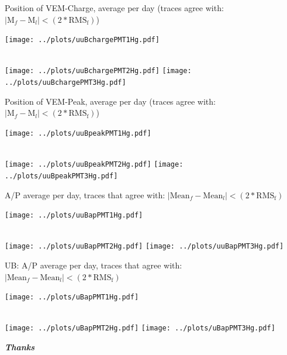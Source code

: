 \documentclass[aspectratio=169]{beamer}
\begin{document}
\begin{frame}
	Position of VEM-Charge, average per day (traces agree with: $\mid \mathrm{M}_f - \mathrm{M}_l \mid < \left( 2*\mathrm{RMS_f} \right) $)

  \centering
	\texttt{[image: ../plots/uuBchargePMT1Hg.pdf]}\quad%
	\begin{minipage}[b][0.4\textheight][c]
		{.45\linewidth}
	\end{minipage}\\[1em]
	\texttt{[image: ../plots/uuBchargePMT2Hg.pdf]}\quad%
	\texttt{[image: ../plots/uuBchargePMT3Hg.pdf]}
\end{frame}


\begin{frame}
	Position of VEM-Peak, average per day (traces agree with: $\mid \mathrm{M}_f - \mathrm{M}_l \mid < \left( 2*\mathrm{RMS_f} \right) $)

  \centering
	\texttt{[image: ../plots/uuBpeakPMT1Hg.pdf]}\quad%
	\begin{minipage}[b][0.4\textheight][c]
		{.45\linewidth}
	\end{minipage}\\[1em]
	\texttt{[image: ../plots/uuBpeakPMT2Hg.pdf]}\quad%
	\texttt{[image: ../plots/uuBpeakPMT3Hg.pdf]}
\end{frame}


\begin{frame}
	A/P average per day, traces that agree with: $\mid \mathrm{Mean}_f - \mathrm{Mean}_l \mid < \left( 2*\mathrm{RMS_f} \right) $

  \centering
	\texttt{[image: ../plots/uuBapPMT1Hg.pdf]}%
	\begin{minipage}[b][0.2\textheight][c]
		{.15\linewidth}
	\end{minipage}\\[1em]
	\texttt{[image: ../plots/uuBapPMT2Hg.pdf]}\quad%
	\texttt{[image: ../plots/uuBapPMT3Hg.pdf]}
\end{frame}


\begin{frame}
	UB: A/P average per day, traces that agree with: $\mid \mathrm{Mean}_f - \mathrm{Mean}_l \mid < \left( 2*\mathrm{RMS_f} \right) $

  \centering
	\texttt{[image: ../plots/uBapPMT1Hg.pdf]}%
	\begin{minipage}[b][0.2\textheight][c]
		{.15\linewidth}
	\end{minipage}\\[1em]
	\texttt{[image: ../plots/uBapPMT2Hg.pdf]}\quad%
	\texttt{[image: ../plots/uBapPMT3Hg.pdf]}
\end{frame}



\begin{frame}
  \centering
	{\Huge\bf\it Thanks}
\end{frame}
\end{document}
